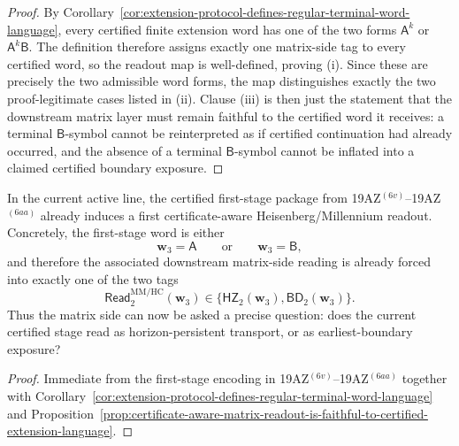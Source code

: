 \begin{proof}
By Corollary~\ref{cor:extension-protocol-defines-regular-terminal-word-language}, every certified finite extension word has one of the two forms \(\mathsf A^k\) or \(\mathsf A^k\mathsf B\). The definition therefore assigns exactly one matrix-side tag to every certified word, so the readout map is well-defined, proving (i). Since these are precisely the two admissible word forms, the map distinguishes exactly the two proof-legitimate cases listed in (ii). Clause (iii) is then just the statement that the downstream matrix layer must remain faithful to the certified word it receives: a terminal \(\mathsf B\)-symbol cannot be reinterpreted as if certified continuation had already occurred, and the absence of a terminal \(\mathsf B\)-symbol cannot be inflated into a claimed certified boundary exposure.
\end{proof}

\begin{corollary}
\label{cor:present-sigma3-package-already-induces-first-certificate-aware-matrix-reading}
In the current active line, the certified first-stage package from 19AZ$^{(6v)}$--19AZ$^{(6aa)}$ already induces a first certificate-aware Heisenberg/Millennium readout. Concretely, the first-stage word is either
\[
  \mathbf w_3=\mathsf A
  \qquad\text{or}\qquad
  \mathbf w_3=\mathsf B,
\]
and therefore the associated downstream matrix-side reading is already forced into exactly one of the two tags
\[
  \mathsf{Read}^{\mathrm{MM/HC}}_{2}(\mathbf w_3)
  \in
  \{\mathsf{HZ}_{2}(\mathbf w_3),\mathsf{BD}_{2}(\mathbf w_3)\}.
\]
Thus the matrix side can now be asked a precise question: does the current certified stage read as horizon-persistent transport, or as earliest-boundary exposure?
\end{corollary}

\begin{proof}
Immediate from the first-stage encoding in 19AZ$^{(6v)}$--19AZ$^{(6aa)}$ together with Corollary~\ref{cor:extension-protocol-defines-regular-terminal-word-language} and Proposition~\ref{prop:certificate-aware-matrix-readout-is-faithful-to-certified-extension-language}.
\end{proof}

